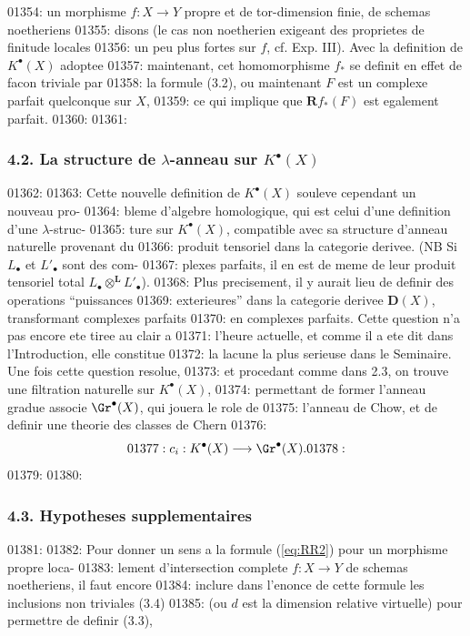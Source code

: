 01354: un morphisme $f: X \to Y$ propre et de tor-dimension finie, de schemas noetheriens
01355: disons (le cas non noetherien exigeant des proprietes de finitude locales
01356: un peu plus fortes sur $f$, cf. Exp. III). Avec la definition de $K^{\bullet}(X)$ adoptee
01357: maintenant, cet homomorphisme $f_{*}$ se definit en effet de facon triviale par
01358: la formule (3.2), ou maintenant $F$ est un complexe parfait quelconque sur $X$,
01359: ce qui implique que $\mathbf{R}f_{*}(F)$ est egalement parfait.
01360: 
01361: \subsubsection*{4.2. La structure de $\lambda$-anneau sur $K^{\bullet}(X)$}
01362: 
01363: Cette nouvelle definition de $K^{\bullet}(X)$ souleve cependant un nouveau pro-
01364: bleme d'algebre homologique, qui est celui d'une definition d'une $\lambda$-struc-
01365: ture sur $K^{\bullet}(X)$, compatible avec sa structure d'anneau naturelle provenant du
01366: produit tensoriel dans la categorie derivee. (NB Si $L_{\bullet}$ et $L'_{\bullet}$ sont des com-
01367: plexes parfaits, il en est de meme de leur produit tensoriel total $L_{\bullet} \otimes^{\mathbf{L}} L'_{\bullet}$).
01368: Plus precisement, il y aurait lieu de definir des operations ``puissances
01369: exterieures'' dans la categorie derivee $\mathbf{D}(X)$, transformant complexes parfaits
01370: en complexes parfaits. Cette question n'a pas encore ete tiree au clair a
01371: l'heure actuelle, et comme il a ete dit dans l'Introduction, elle constitue
01372: la lacune la plus serieuse dans le Seminaire. Une fois cette question resolue,
01373: et procedant comme dans 2.3, on trouve une filtration naturelle sur $K^{\bullet}(X)$,
01374: permettant de former l'anneau gradue associe $\Gr^{\bullet}(X)$, qui jouera le role de
01375: l'anneau de Chow, et de definir une theorie des classes de Chern
01376: \[
01377: c_i: K^{\bullet}(X) \longrightarrow \Gr^{\bullet}(X).
01378: \]
01379: 
01380: \subsubsection*{4.3. Hypotheses supplementaires}
01381: 
01382: Pour donner un sens a la formule (\ref{eq:RR2}) pour un morphisme propre loca-
01383: lement d'intersection complete $f: X \to Y$ de schemas noetheriens, il faut encore
01384: inclure dans l'enonce de cette formule les inclusions non triviales (3.4)
01385: (ou $d$ est la dimension relative virtuelle) pour permettre de definir (3.3),
